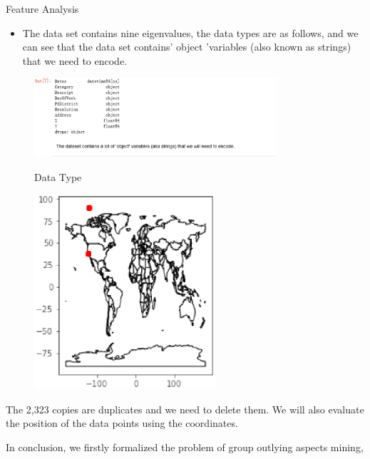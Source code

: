 \documentclass[
 size=14pt,
 paper=smartboard,  %
 mode=present, 		%
 display=slides, 	%
 style=tuliplab,  	%
 pauseslide,
 fleqn,leqno]{powerdot}
\begin{document}
\begin{slide}[toc=,bm=]{Feature Analysis}
\begin{itemize}
\item The data set contains nine eigenvalues, the data types are as follows,
 and we can see that the data set contains' object 'variables (also known as strings) 
 that we need to encode.

\end{itemize}

\begin{figure}[htbp]
  \centering
  \begin{minipage}[t]{0.48\textwidth}
    \centering
    \includegraphics[width=0.8\textwidth]{kaggle/3.eps}
    \vspace{0.4em}
    \caption{ Data Type}
  \end{minipage}
  \begin{minipage}[t]{0.48\textwidth}
    \centering
    \includegraphics[width=0.6\textwidth]{kaggle/5.eps}
    \vspace{0.4em}
    \caption{}
  \end{minipage}
\end{figure}

The 2,323 copies are duplicates and we need to delete them.
We will also evaluate the position of the data points using the coordinates.
\begin{note}
In conclusion,
we firstly formalized the problem of
group outlying aspects mining,


\end{note}
\end{slide}
\end{document}
